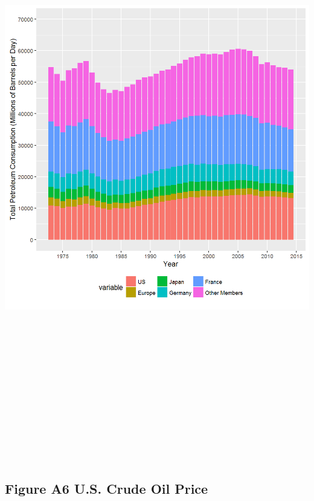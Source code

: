 \documentclass[]{article}
\begin{document}
\includegraphics[height=10.41667in]{images/EIAdata_oecd_petrol_cons.png}

\newpage

\subsection{Figure A6 U.S. Crude Oil
Price}\label{figure-a6-u.s.-crude-oil-price}
\end{document}
